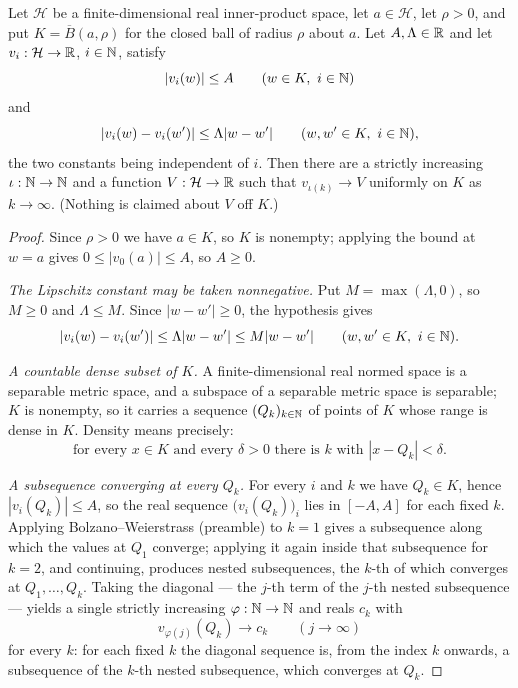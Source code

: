\begin{lemma}
Let $\mathcal H$ be a finite-dimensional real inner-product space, let
$a\in\mathcal H$, let $\rho>0$, and put $K=\overline B(a,\rho)$ for the closed
ball of radius $\rho$ about $a$. Let $A,\Lambda\in\mathbb{R}$ and let
$v_i:\mathcal H\to\mathbb{R}$, $i\in\mathbb{N}$, satisfy
\[
  |v_i(w)|\le A\qquad(w\in K,\ i\in\mathbb{N})
\]
and
\[
  |v_i(w)-v_i(w')|\le\Lambda|w-w'|\qquad(w,w'\in K,\ i\in\mathbb{N}),
\]
the two constants being independent of $i$. Then there are a strictly increasing
$\iota:\mathbb{N}\to\mathbb{N}$ and a function $V:\mathcal H\to\mathbb{R}$ such that
$v_{\iota(k)}\to V$ uniformly on $K$ as $k\to\infty$. (Nothing is claimed about
$V$ off $K$.)
\end{lemma}
\begin{proof}
Since $\rho>0$ we have $a\in K$, so $K$ is nonempty; applying the bound at
$w=a$ gives $0\le|v_0(a)|\le A$, so $A\ge0$.

\emph{The Lipschitz constant may be taken nonnegative.} Put $M=\max(\Lambda,0)$,
so $M\ge0$ and $\Lambda\le M$. Since $|w-w'|\ge0$, the hypothesis gives
\begin{equation}\label{eq:elul-lip}
  |v_i(w)-v_i(w')|\le\Lambda|w-w'|\le M|w-w'|\qquad(w,w'\in K,\ i\in\N).
\end{equation}

\emph{A countable dense subset of $K$.} A finite-dimensional real normed space is
a separable metric space, and a subspace of a separable metric space is
separable; $K$ is nonempty, so it carries a sequence $(Q_k)_{k\in\mathbb{N}}$ of points
of $K$ whose range is dense in $K$. Density means precisely:
\begin{equation}\label{eq:elul-dense}
  \text{for every }x\in K\text{ and every }\delta>0
  \text{ there is }k\text{ with }|x-Q_k|<\delta .
\end{equation}

\emph{A subsequence converging at every $Q_k$.} For every $i$ and $k$ we have
$Q_k\in K$, hence $|v_i(Q_k)|\le A$, so the real sequence
$\bigl(v_i(Q_k)\bigr)_i$ lies in $[-A,A]$ for each fixed $k$. Applying
Bolzano--Weierstrass (preamble) to $k=1$ gives a subsequence along which the
values at $Q_1$ converge; applying it again inside that subsequence for $k=2$,
and continuing, produces nested subsequences, the $k$-th of which converges at
$Q_1,\dots,Q_k$. Taking the diagonal --- the $j$-th term of the $j$-th nested
subsequence --- yields a single strictly increasing $\varphi:\mathbb{N}\to\mathbb{N}$ and reals
$c_k$ with
\begin{equation}\label{eq:elul-pt}
  v_{\varphi(j)}(Q_k)\longrightarrow c_k\qquad(j\to\infty)
\end{equation}
for every $k$: for each fixed $k$ the diagonal sequence is, from the index $k$
onwards, a subsequence of the $k$-th nested subsequence, which converges at
$Q_k$.


\end{proof}
